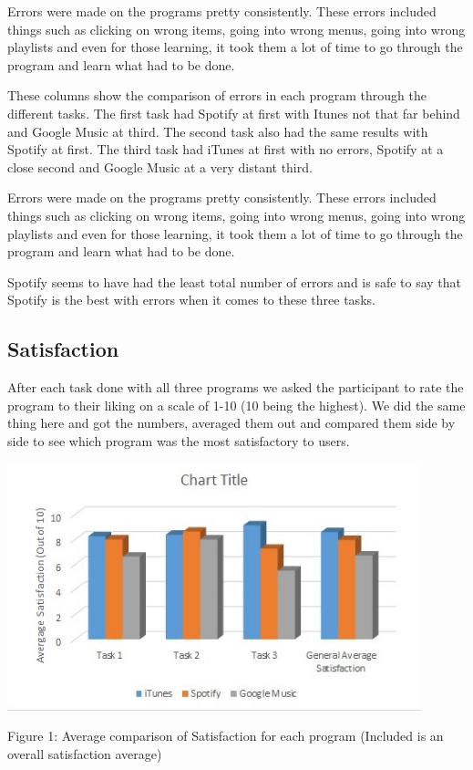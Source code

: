 \documentclass{article}
\begin{document}
{Errors were made on the programs pretty consistently. These errors included things such as clicking on wrong items, going into wrong menus, going into wrong playlists  and even for those learning, it took them a lot of time to go through the program and learn what had to be done.

These columns show the comparison of errors in each program through the different tasks. The first task had Spotify at first with Itunes not that far behind and Google Music at third. The second task also had the same results with Spotify at first. The third task had iTunes at first with no errors, Spotify at a close second and Google Music at a very distant third.

Errors were made on the programs pretty consistently. These errors included things such as clicking on wrong items, going into wrong menus, going into wrong playlists  and even for those learning, it took them a lot of time to go through the program and learn what had to be done.

Spotify seems to have had the least total number of errors and is safe to say that Spotify is the best with errors when it comes to these three tasks.

\subsection{Satisfaction}
After each task done with all three programs we asked the participant to rate the program to their liking on a scale of 1-10 (10 being the highest). We did the same thing here and got the numbers, averaged them out and compared them side by side to see which program was the most satisfactory to users.

\begin{center}
\includegraphics[width=120mm]{Satisfaction.jpg}
\end{center}
\begin{center}
Figure 1: Average comparison of Satisfaction for each program (Included is an overall satisfaction average)
\end{center}

}
\end{document}

